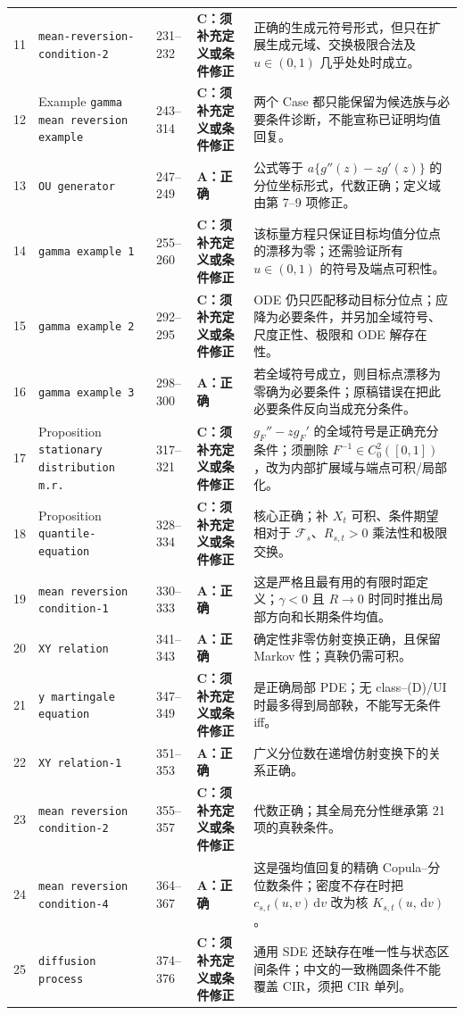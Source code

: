 \documentclass[UTF8,11pt]{ctexart}
\newcommand{\dd}{\,\mathrm d}
\newcommand{\Acat}{\textcolor{green!45!black}{\textbf{A：正确}}}
\newcommand{\Ccat}{\textcolor{orange!80!black}{\textbf{C：须补充定义或条件修正}}}
\begin{document}
\begin{longtable}{p{}p{}p{}p{}p{}}
11 & \texttt{mean-reversion-\allowbreak condition-2} & 231--232 & \Ccat & 正确的生成元符号形式，但只在扩展生成元域、交换极限合法及 $u\in(0,1)$ 几乎处处时成立。\\
12 & Example \texttt{gamma mean reversion example} & 243--314 & \Ccat & 两个 Case 都只能保留为候选族与必要条件诊断，不能宣称已证明均值回复。\\
13 & \texttt{OU generator} & 247--249 & \Acat & 公式等于 $a\{g''(z)-zg'(z)\}$ 的分位坐标形式，代数正确；定义域由第 7--9 项修正。\\
14 & \texttt{gamma example 1} & 255--260 & \Ccat & 该标量方程只保证目标均值分位点的漂移为零；还需验证所有 $u\in(0,1)$ 的符号及端点可积性。\\
15 & \texttt{gamma example 2} & 292--295 & \Ccat & ODE 仍只匹配移动目标分位点；应降为必要条件，并另加全域符号、尺度正性、极限和 ODE 解存在性。\\
16 & \texttt{gamma example 3} & 298--300 & \Acat & 若全域符号成立，则目标点漂移为零确为必要条件；原稿错误在把此必要条件反向当成充分条件。\\
17 & Proposition \texttt{stationary distribution m.r.} & 317--321 & \Ccat & $g_F''-zg_F'$ 的全域符号是正确充分条件；须删除 $F^{-1}\in C_0^2([0,1])$，改为内部扩展域与端点可积/局部化。\\
18 & Proposition \texttt{quantile-equation} & 328--334 & \Ccat & 核心正确；补 $X_t$ 可积、条件期望相对于 $\mathcal F_s$、$R_{s,t}>0$ 乘法性和极限交换。\\
19 & \texttt{mean reversion condition-1} & 330--333 & \Acat & 这是严格且最有用的有限时距定义；$\gamma<0$ 且 $R\to0$ 时同时推出局部方向和长期条件均值。\\
20 & \texttt{XY relation} & 341--343 & \Acat & 确定性非零仿射变换正确，且保留 Markov 性；真鞅仍需可积。\\
21 & \texttt{y martingale equation} & 347--349 & \Ccat & 是正确局部 PDE；无 class--(D)/UI 时最多得到局部鞅，不能写无条件 iff。\\
22 & \texttt{XY relation-1} & 351--353 & \Acat & 广义分位数在递增仿射变换下的关系正确。\\
23 & \texttt{mean reversion \allowbreak condition-2} & 355--357 & \Ccat & 代数正确；其全局充分性继承第 21 项的真鞅条件。\\
24 & \texttt{mean reversion \allowbreak condition-4} & 364--367 & \Acat & 这是强均值回复的精确 Copula--分位数条件；密度不存在时把 $c_{s,t}(u,v)\dd v$ 改为核 $K_{s,t}(u,\dd v)$。\\
25 & \texttt{diffusion process} & 374--376 & \Ccat & 通用 SDE 还缺存在唯一性与状态区间条件；中文的一致椭圆条件不能覆盖 CIR，须把 CIR 单列。\\

\end{longtable}
\end{document}

